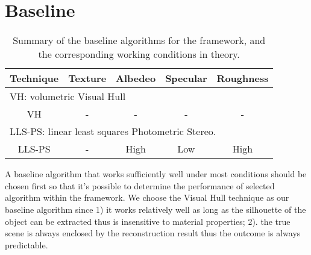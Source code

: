 \section{Baseline}
\begin{table}[!htbp]
\centering
\begin{tabular}{c|c|c|c|c}
\hline
Technique & Texture & Albedeo & Specular & Roughness\\
\hline\hline
\multicolumn{5}{l}{VH: volumetric Visual Hull}\\
\hline
VH & - & - & - & -\\
\hline\hline
\multicolumn{5}{l}{LLS-PS: linear least squares Photometric Stereo.}\\
\hline
LLS-PS & - & High & Low & High\\
\hline
\end{tabular}
\caption{Summary of the baseline algorithms for the framework, and the corresponding working conditions in theory.}
\label{tab:selected_baseline_algos}
\end{table}
A baseline algorithm that works sufficiently well under most conditions should be chosen first so that it's possible to determine the performance of selected algorithm within the framework. We choose the Visual Hull technique as our baseline algorithm since 1) it works relatively well as long as the silhouette of the object can be extracted thus is insensitive to material properties; 2). the true scene is always enclosed by the reconstruction result thus the outcome is always predictable.

